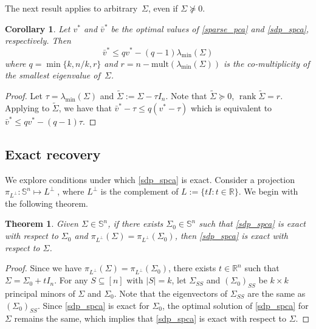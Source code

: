 \documentclass[11pt]{amsart}
\theoremstyle{plain}
\newtheorem{thm}{Theorem}[section]
\newtheorem{cor}{Corollary}[section]
\theoremstyle{definition}
\theoremstyle{remark}
\newcommand{\RR}{\mathbb{R}}
\renewcommand{\SS}{{\mathbb{S}}}
\DeclareMathOperator{\rank}{rank}
\begin{document}
	The next result applies to arbitrary~\(\Sigma\),
	even if \( \Sigma \not\succeq 0 \).
	
	\begin{cor}\label{cor:lower_bound_spca}
		Let $v^*$ and $\bar v^*$ be the optimal values of \eqref{sparse_pca} and \eqref{sdp_spca}, respectively.
		Then
		\[
		\bar v^* \leq q v^* - (q-1) \lambda_{\min}(\Sigma)
		\]
		where $q = \min\{k, n/k, r\}$ and $r = n - \mathrm{mult}(\lambda_{\min}(\Sigma))$ is the co-multiplicity of the smallest eigenvalue of~$\Sigma$.
	\end{cor}
	\begin{proof}
		Let \(\tau = \lambda_{\min}(\Sigma)\) and \(\tilde \Sigma:=\Sigma - \tau I_n\).
		Note that \(\tilde\Sigma\succeq 0\), $\rank \tilde \Sigma = r$.
		Applying  to $\tilde\Sigma$, we have that \(\bar v^* - \tau \leq q(v^* - \tau)\) which is equivalent to \(\bar v^*\leq qv^* - (q-1)\tau \). 
	\end{proof}
	
	\subsection{Exact recovery} 
	We explore conditions under which \eqref{sdp_spca} is exact. Consider a projection \(\pi_{L^\perp}:\SS^n \mapsto L^\perp\;\), where \(
	L^\perp\) is the complement of \(L:= \{ t I : t \in \RR\}\). We begin with the following theorem.
	
	\begin{thm}\label{thm:spca_exact_case}
		Given \(\Sigma \in \SS^n\), if there exists \(\Sigma_0\in\SS^n\) such that \eqref{sdp_spca} is exact with respect to \(\Sigma_0\) and \(\pi_{L^\perp}(\Sigma) = \pi_{L^\perp}(\Sigma_0)\), then  \eqref{sdp_spca} is exact with respect to \(\Sigma\). 
	\end{thm}
	\begin{proof}
		Since we have \(\pi_{L^\perp}(\Sigma) = \pi_{L^\perp}(\Sigma_0)\), there exists \(t\in \RR^n\) such that \(\Sigma = \Sigma_0 + tI_n\). For any \(S \subseteq [n]\) with \(|S| = k\), let \(\Sigma_{SS}\) and \((\Sigma_0)_{SS}\) be $k\times k$ principal minors of \(\Sigma\) and \(\Sigma_0\). Note that the eigenvectors of  \(\Sigma_{SS}\) are the same as \((\Sigma_0)_{SS}\). Since \eqref{sdp_spca} is exact for \(\Sigma_0\), the optimal solution of \eqref{sdp_spca} for \(\Sigma\) remains the same, which implies that \eqref{sdp_spca} is exact with respect to \(\Sigma\).
	\end{proof}
	
\end{document}
